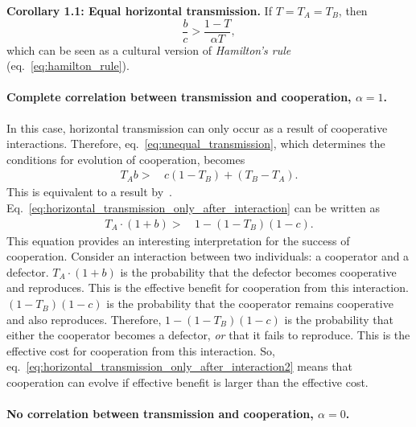 \documentclass[12pt]{extarticle}
\begin{document}
\textbf{Corollary 1.1: Equal horizontal transmission.}
If $T=T_A=T_B$, then
\begin{equation}
\label{eq:equal_transmission}
\frac{b}{c} > \frac{1-T}{\alpha T},
\end{equation}
which can be seen as a cultural version of \emph{Hamilton's rule} (eq.~\ref{eq:hamilton_rule}).

\paragraph*{Complete correlation between transmission and cooperation, $\alpha=1$.}
	
In this case, horizontal transmission can only occur as a result of cooperative interactions.
Therefore, eq.~\ref{eq:unequal_transmission}, which determines the conditions for evolution of cooperation, becomes
\begin{equation} 
\begin{split} \label{eq:horizontal_transmission_only_after_interaction}
T_A b > \,& c (1-T_B) + (T_B - T_A).
\end{split}
\end{equation}
This is equivalent to a result by~\citet[eq.~1]{lewin2017microbes}.
Eq.~\ref{eq:horizontal_transmission_only_after_interaction} can be written as
\begin{equation} 
\begin{split} \label{eq:horizontal_transmission_only_after_interaction2}
T_A\cdot(1+b) > \,& 1 - (1-T_B)(1-c).
\end{split}
\end{equation}
This equation provides an interesting interpretation for the success of cooperation. 
Consider an interaction between two individuals: a cooperator and a defector.
$T_A\cdot(1+b)$ is the probability that the defector becomes cooperative and reproduces.
This is the effective benefit for cooperation from this interaction.
$(1-T_B)(1-c)$ is the probability that the cooperator remains cooperative and also reproduces. 
Therefore, $1 - (1-T_B)(1-c)$ is the probability that either the cooperator becomes a defector, \emph{or} that it fails to reproduce.
This is the effective cost for cooperation from this interaction.
So, eq.~\ref{eq:horizontal_transmission_only_after_interaction2} means that cooperation can evolve if effective benefit is larger than the effective cost.

\paragraph*{No correlation between transmission and cooperation, $\alpha=0$.}
\end{document}
